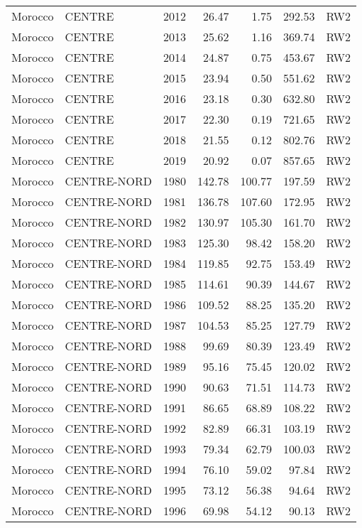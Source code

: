 \begin{longtable}{lllrrrl}
  Morocco & CENTRE & 2012 & 26.47 & 1.75 & 292.53 & RW2 \\ 
  Morocco & CENTRE & 2013 & 25.62 & 1.16 & 369.74 & RW2 \\ 
  Morocco & CENTRE & 2014 & 24.87 & 0.75 & 453.67 & RW2 \\ 
  Morocco & CENTRE & 2015 & 23.94 & 0.50 & 551.62 & RW2 \\ 
  Morocco & CENTRE & 2016 & 23.18 & 0.30 & 632.80 & RW2 \\ 
  Morocco & CENTRE & 2017 & 22.30 & 0.19 & 721.65 & RW2 \\ 
  Morocco & CENTRE & 2018 & 21.55 & 0.12 & 802.76 & RW2 \\ 
  Morocco & CENTRE & 2019 & 20.92 & 0.07 & 857.65 & RW2 \\ 
  Morocco & CENTRE-NORD & 1980 & 142.78 & 100.77 & 197.59 & RW2 \\ 
  Morocco & CENTRE-NORD & 1981 & 136.78 & 107.60 & 172.95 & RW2 \\ 
  Morocco & CENTRE-NORD & 1982 & 130.97 & 105.30 & 161.70 & RW2 \\ 
  Morocco & CENTRE-NORD & 1983 & 125.30 & 98.42 & 158.20 & RW2 \\ 
  Morocco & CENTRE-NORD & 1984 & 119.85 & 92.75 & 153.49 & RW2 \\ 
  Morocco & CENTRE-NORD & 1985 & 114.61 & 90.39 & 144.67 & RW2 \\ 
  Morocco & CENTRE-NORD & 1986 & 109.52 & 88.25 & 135.20 & RW2 \\ 
  Morocco & CENTRE-NORD & 1987 & 104.53 & 85.25 & 127.79 & RW2 \\ 
  Morocco & CENTRE-NORD & 1988 & 99.69 & 80.39 & 123.49 & RW2 \\ 
  Morocco & CENTRE-NORD & 1989 & 95.16 & 75.45 & 120.02 & RW2 \\ 
  Morocco & CENTRE-NORD & 1990 & 90.63 & 71.51 & 114.73 & RW2 \\ 
  Morocco & CENTRE-NORD & 1991 & 86.65 & 68.89 & 108.22 & RW2 \\ 
  Morocco & CENTRE-NORD & 1992 & 82.89 & 66.31 & 103.19 & RW2 \\ 
  Morocco & CENTRE-NORD & 1993 & 79.34 & 62.79 & 100.03 & RW2 \\ 
  Morocco & CENTRE-NORD & 1994 & 76.10 & 59.02 & 97.84 & RW2 \\ 
  Morocco & CENTRE-NORD & 1995 & 73.12 & 56.38 & 94.64 & RW2 \\ 
  Morocco & CENTRE-NORD & 1996 & 69.98 & 54.12 & 90.13 & RW2 \\ 

\end{longtable}
